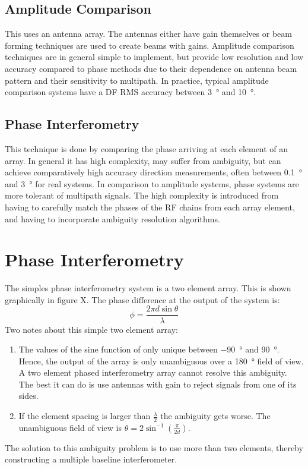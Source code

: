 \subsection{Amplitude Comparison}
This uses an antenna array. The antennas either have gain themselves or beam forming techniques are used to create beams with gains. Amplitude comparison techniques are in general simple to implement, but provide low resolution and low accuracy compared to phase methods due to their dependence on antenna beam pattern and their sensitivity to multipath. In practice, typical amplitude comparison systems have a DF RMS accuracy between \SI{3}{\degree} and \SI{10}{\degree}.
\subsection{Phase Interferometry}
This technique is done by comparing the phase arriving at each element of an array. In general it has high complexity, may suffer from ambiguity, but can achieve comparatively high accuracy direction measurements, often between \SI{0.1}{\degree} and \SI{3}{\degree} for real systems. In comparison to amplitude systems, phase systems are more tolerant of multipath signals. The high complexity is introduced from having to carefully match the phases of the RF chains from each array element, and having to incorporate ambiguity resolution algorithms. 

\section{Phase Interferometry}
The simples phase interferometry system is a two element array. This is shown graphically in figure X. The phase difference at the output of the system is:
\begin{equation}
\phi = \frac{2 \pi d \sin \theta}{\lambda}
\end{equation}
Two notes about this simple two element array:
\begin{enumerate}
  \item The values of the sine function of only unique between \SI{-90}{\degree} and \SI{90}{\degree}. Hence, the output of the array is only unambiguous over a \SI{180}{\degree} field of view. A two element phased interferometry array cannot resolve this ambiguity. The best it can do is use antennas with gain to reject signals from one of its sides. 
 \item If the element spacing is larger than \(\frac{\lambda}{2}\) the ambiguity gets worse. The unambiguous field of view is \(\theta = 2 \sin^{-1}(\frac{\pi}{2d})\).
 \end{enumerate}
 The solution to this ambiguity problem is to use more than two elements, thereby constructing a multiple baseline interferometer. 
